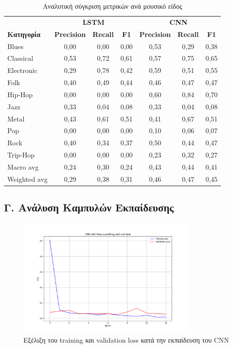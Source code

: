 \documentclass[a4paper,12pt]{article}
\begin{document}
\begin{table}[H]
    \centering
    \tiny
    \begin{tabular}{@{}lcccccc@{}}
        \toprule
        & \multicolumn{3}{c}{\textbf{LSTM}} & \multicolumn{3}{c}{\textbf{CNN}} \\
        \cmidrule(lr){2-4} \cmidrule(lr){5-7}
        \textbf{Κατηγορία} & \textbf{Precision} & \textbf{Recall} & \textbf{F1} & \textbf{Precision} & \textbf{Recall} & \textbf{F1} \\
        \midrule
        Blues & 0,00 & 0,00 & 0,00 & 0,53 & 0,29 & 0,38 \\
        Classical & 0,53 & 0,72 & 0,61 & 0,57 & 0,75 & 0,65 \\
        Electronic & 0,29 & 0,78 & 0,42 & 0,59 & 0,51 & 0,55 \\
        Folk & 0,40 & 0,49 & 0,44 & 0,46 & 0,47 & 0,47 \\
        Hip-Hop & 0,00 & 0,00 & 0,00 & 0,60 & 0,84 & 0,70 \\
        Jazz & 0,33 & 0,04 & 0,08 & 0,33 & 0,04 & 0,08 \\
        Metal & 0,43 & 0,61 & 0,51 & 0,41 & 0,67 & 0,51 \\
        Pop & 0,00 & 0,00 & 0,00 & 0,10 & 0,06 & 0,07 \\
        Rock & 0,40 & 0,34 & 0,37 & 0,50 & 0,44 & 0,47 \\
        Trip-Hop & 0,00 & 0,00 & 0,00 & 0,23 & 0,32 & 0,27 \\
        \midrule
        Macro avg & 0,24 & 0,30 & 0,24 & 0,43 & 0,44 & 0,41 \\
        Weighted avg & 0,29 & 0,38 & 0,31 & 0,46 & 0,47 & 0,45 \\
        \bottomrule
    \end{tabular}
    \caption{Αναλυτική σύγκριση μετρικών ανά μουσικό είδος}
\end{table}

\subsection*{Γ. Ανάλυση Καμπυλών Εκπαίδευσης}

\begin{figure}[h!]
    \centering
    \includegraphics[width=0.8\textwidth]{images/CNN with False overfitting with mel feat.png}
    \caption{Εξέλιξη του training και validation loss κατά την εκπαίδευση του CNN}
    \label{fig:loss_evolution}
\end{figure}
\end{document}

